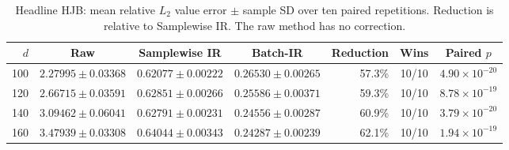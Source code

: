 \begin{table}[htbp]
\centering\small
\caption{Headline HJB: mean relative $L_2$ value error $\pm$ sample SD over ten paired repetitions. Reduction is relative to Samplewise IR. The raw method has no correction.}\label{tab:extended-hjb}
\begin{tabular}{@{}rccc rcc@{}}
\toprule
$d$ & Raw & Samplewise IR & Batch-IR & Reduction & Wins & Paired $p$\\
\midrule
100 & $2.27995\pm0.03368$ & $0.62077\pm0.00222$ & $0.26530\pm0.00265$ & 57.3\% & 10/10 & $4.90\times10^{-20}$\\
120 & $2.66715\pm0.03591$ & $0.62851\pm0.00266$ & $0.25586\pm0.00371$ & 59.3\% & 10/10 & $8.78\times10^{-19}$\\
140 & $3.09462\pm0.06041$ & $0.62791\pm0.00231$ & $0.24556\pm0.00287$ & 60.9\% & 10/10 & $3.79\times10^{-20}$\\
160 & $3.47939\pm0.03308$ & $0.64044\pm0.00343$ & $0.24287\pm0.00239$ & 62.1\% & 10/10 & $1.94\times10^{-19}$\\
\bottomrule
\end{tabular}
\end{table}
